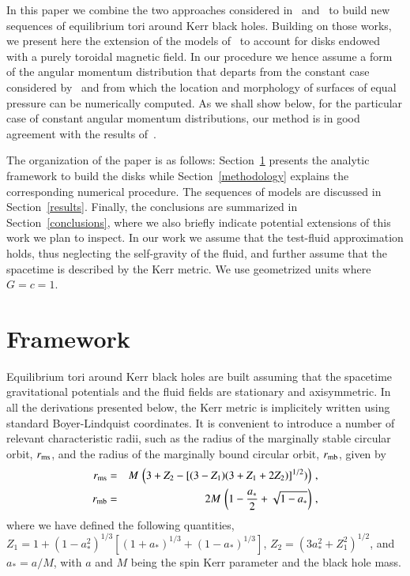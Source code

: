 \documentclass{aa}
\begin{document}
 In this paper we combine the two approaches considered in~\cite{Komissarov:2006} and~\citet{Qian:2009} to build new sequences of equilibrium tori around Kerr black holes.
 Building on those works, we present here the extension of the models of~\citet{Qian:2009} to account for disks endowed with a purely toroidal magnetic field. In our procedure we hence assume a form of the angular momentum distribution that departs from the constant case considered by~\cite{Komissarov:2006} and from which the location and morphology
of surfaces of equal pressure can be numerically computed. As we shall show below, for the particular case of constant angular momentum distributions, our method is in good agreement with the results of~\citet{Komissarov:2006}.

The organization of the paper is as follows: Section~\ref{framework} presents the analytic framework to build the disks while Section~\ref{methodology} explains the corresponding numerical procedure. The sequences of models are discussed in Section~\ref{results}. Finally, the conclusions are summarized in Section~\ref{conclusions}, where we also briefly indicate potential extensions of this work we plan to inspect. In our work we assume that the test-fluid approximation holds, thus neglecting the self-gravity of the fluid, and further assume that the spacetime is described by the Kerr metric. We use geometrized units where $G = c = 1$.

\section{Framework}
\label{framework}

Equilibrium tori around Kerr black holes are built assuming that the spacetime gravitational potentials and the fluid fields are stationary and axisymmetric. In all the derivations presented below, the Kerr metric is implicitely written using standard Boyer-Lindquist coordinates. It is convenient to introduce a number of relevant characteristic radii, such as the radius
of the marginally stable circular orbit, $r_{\rm ms}$, and the radius of the marginally bound circular orbit, $r_{\rm mb}$, given by
\begin{eqnarray}
r_{\rm ms} &=& M\,\left(3+Z_2-\left[(3-Z_1)(3+Z_1+2Z_2)\right]^{1/2})\right)\,,
\\
r_{\rm mb} &=& 2M\,\left(  1-\frac{a_*}{2} + \sqrt{1-a_*} \right)\,,
\end{eqnarray}
where we have defined the following quantities, $Z_1=1+(1-a_*^2)^{1/3}[(1+a_*)^{1/3}+(1-a_*)^{1/3}]$, $Z_2=(3a_*^2+Z_1^2)^{1/2}$, and $a_*=a/M$, with $a$ and $M$ being the spin Kerr parameter and the black hole mass.
\end{document}
